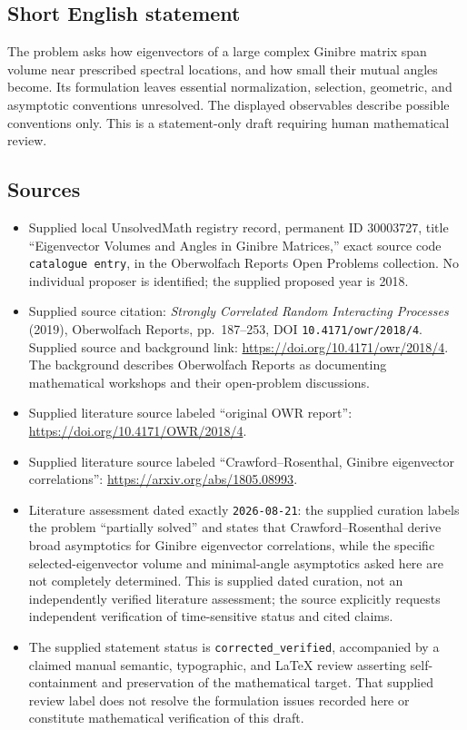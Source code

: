 \documentclass[11pt]{article}
\begin{document}
\subsection{Short English statement}
The problem asks how eigenvectors of a large complex Ginibre matrix span volume near prescribed spectral locations, and how small their mutual angles become. Its formulation leaves essential normalization, selection, geometric, and asymptotic conventions unresolved. The displayed observables describe possible conventions only. This is a statement-only draft requiring human mathematical review.
\subsection{Sources}
\begin{itemize}
\item Supplied local UnsolvedMath registry record, permanent ID \(30003727\), title ``Eigenvector Volumes and Angles in Ginibre Matrices,'' exact source code \texttt{catalogue entry}, in the Oberwolfach Reports Open Problems collection. No individual proposer is identified; the supplied proposed year is 2018.
\item Supplied source citation: \emph{Strongly Correlated Random Interacting Processes} (2019), Oberwolfach Reports, pp.\ 187--253, DOI \texttt{10.4171/owr/2018/4}. Supplied source and background link: \url{https://doi.org/10.4171/owr/2018/4}. The background describes Oberwolfach Reports as documenting mathematical workshops and their open-problem discussions.
\item Supplied literature source labeled ``original OWR report'': \url{https://doi.org/10.4171/OWR/2018/4}.
\item Supplied literature source labeled ``Crawford--Rosenthal, Ginibre eigenvector correlations'': \url{https://arxiv.org/abs/1805.08993}.
\item Literature assessment dated exactly \texttt{2026-08-21}: the supplied curation labels the problem ``partially solved'' and states that Crawford--Rosenthal derive broad asymptotics for Ginibre eigenvector correlations, while the specific selected-eigenvector volume and minimal-angle asymptotics asked here are not completely determined. This is supplied dated curation, not an independently verified literature assessment; the source explicitly requests independent verification of time-sensitive status and cited claims.
\item The supplied statement status is \texttt{corrected\_verified}, accompanied by a claimed manual semantic, typographic, and LaTeX review asserting self-containment and preservation of the mathematical target. That supplied review label does not resolve the formulation issues recorded here or constitute mathematical verification of this draft.
\end{itemize}
\end{document}
